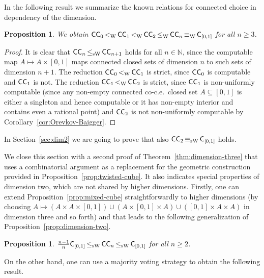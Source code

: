 \documentclass[a4paper]{amsart}
\def\IN{{\mathbb{N}}}
\def\In{\subseteq}
\def\C{\mbox{\rm\sffamily C}}
\def\ConC{\mbox{\rm\sffamily CC}}
\def\leqW{\mathop{\leq_{\mathrm{W}}}}
\def\equivW{\mathop{\equiv_{\mathrm{W}}}}
\def\leqSW{\mathop{\leq_{\mathrm{sW}}}}
\def\equivSW{\mathop{\equiv_{\mathrm{sW}}}}
\def\lW{\mathop{<_{\mathrm{W}}}}
\newtheorem{proposition}[theorem]{Proposition}
\theoremstyle{definition}
\begin{document}
In the following result we summarize the known relations for connected choice in dependency of the dimension.

\begin{proposition}
\label{prop:connected-dimension}
We obtain
$\ConC_0\lW\ConC_1\lW\ConC_2\leqW\ConC_n\equivW\C_{[0,1]}$ for all $n\geq3$.
\end{proposition}
\begin{proof}
It is clear that
$\ConC_n\leqSW\ConC_{n+1}$ holds for all $n\in\IN$, since the computable map $A\mapsto A\times[0,1]$
maps connected closed sets of dimension $n$ to such sets of dimension $n+1$.
The reduction $\ConC_0\lW\ConC_1$ is strict, since $\ConC_0$ is computable and $\ConC_1$ is not.
The reduction $\ConC_1\lW\ConC_2$ is strict, since $\ConC_1$ is non-uniformly computable (since any non-empty
connected co-c.e.\ closed set $A\In[0,1]$ is either a singleton and hence computable or it has non-empty interior and contains even a rational point)
and $\ConC_2$ is not non-uniformly computable by Corollary~\ref{cor:Orevkov-Baigger}.
\end{proof}

In Section~\ref{sec:dim2} we are going to prove that also $\ConC_2\equivSW\C_{[0,1]}$ holds. 

We close this section with a second proof of Theorem~\ref{thm:dimension-three} that uses a combinatorial argument 
as a replacement for the geometric construction provided in Proposition~\ref{prop:twisted-cube}.
It also indicates special properties of dimension two, which are not shared by higher dimensions.
Firstly, one can extend Proposition~\ref{prop:mixed-cube} straightforwardly to higher dimensions
(by choosing $A\mapsto(A\times A\times[0,1])\cup(A\times [0,1]\times A)\cup([0,1]\times A\times A)$
in dimension three and so forth) and that leads to the following generalization of Proposition~\ref{prop:dimension-two}.

\begin{proposition} $\frac{n-1}{n}\C_{[0,1]}\leqSW\ConC_n\leqSW\C_{[0,1]}$ for all $n\geq2$.
\end{proposition}

On the other hand, one can use a majority voting strategy to obtain the following result.
\end{document}
